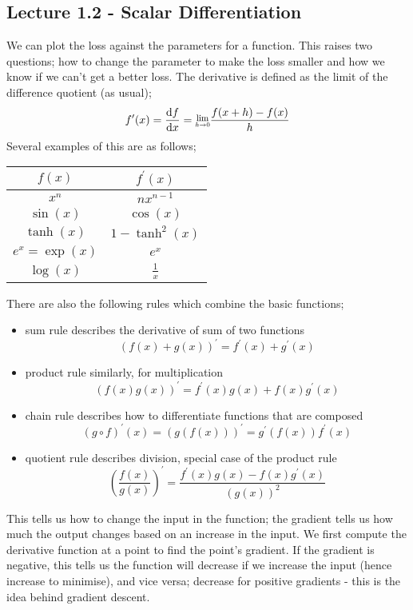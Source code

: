 \documentclass[a4paper, 12pt]{article}
\newcommand{\dif}[2]{\frac{\mathrm{d}#1}{\mathrm{d}#2}}
\newcommand{\limit}[2]{\raisebox{0.5ex}{\scalebox{0.8}{$\displaystyle{\lim_{#1 \to #2}}$}}}
\begin{document}
        \subsection*{Lecture 1.2 - Scalar Differentiation}
            We can plot the loss against the parameters for a function.
            This raises two questions; how to change the parameter to make the loss smaller and how we know if we can't get a better loss.
            The derivative is defined as the limit of the difference quotient (as usual);
            $$f^\prime(x) = \dif{f}{x} = \limit{h}{0} \frac{f(x + h) - f(x)}{h}$$
            Several examples of this are as follows;
            \begin{center}
                \begin{tabular}{c|c}
                    $f(x)$ & $f^\prime(x)$ \\
                    \hline
                    $x^n$ & $nx^{n - 1}$ \\
                    $\sin(x)$ & $\cos(x)$ \\
                    $\tanh(x)$ & $1 - \tanh^2(x)$ \\
                    $e^x = \exp(x)$ & $e^x$ \\
                    $\log(x)$ & $\frac{1}{x}$
                \end{tabular}
            \end{center}
            There are also the following rules which combine the basic functions;
            \begin{itemize}
                \itemsep0em
                \item sum rule \hfill describes the derivative of sum of two functions
                    $$(f(x) + g(x))^\prime = f^\prime(x) + g^\prime(x)$$
                \item product rule \hfill similarly, for multiplication
                    $$(f(x)g(x))^\prime = f^\prime(x)g(x) + f(x)g^\prime(x)$$
                \item chain rule \hfill describes how to differentiate functions that are composed
                    $$(g \circ f)^\prime(x) = (g(f(x)))^\prime = g^\prime(f(x))f^\prime(x)$$
                \item quotient rule \hfill describes division, special case of the product rule
                    $$\left(\frac{f(x)}{g(x)}\right)^\prime = \frac{f^\prime(x)g(x) - f(x)g^\prime(x)}{(g(x))^2}$$
            \end{itemize}
            This tells us how to change the input in the function; the gradient tells us how much the output changes based on an increase in the input.
            We first compute the derivative function at a point to find the point's gradient.
            If the gradient is negative, this tells us the function will decrease if we increase the input (hence increase to minimise), and vice versa; decrease for positive gradients - this is the idea behind gradient descent.
            \medskip
\end{document}
